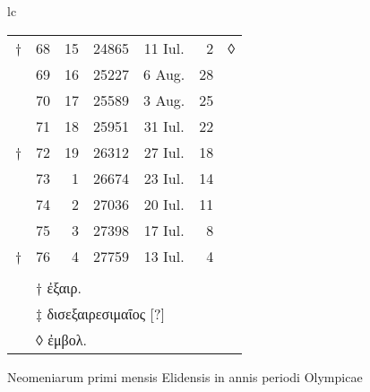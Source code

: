 \begin{tabular}{lc}
\begin{tabular}[t]{r rrccr l}
† & 68 & 15 & 24865 & 11 Iul. &  2 & ◊ \\
\cline{2-6}
~ & 69 & 16 & 25227 &  6 Aug. & 28 \\
~ & 70 & 17 & 25589 &  3 Aug. & 25 \\
~ & 71 & 18 & 25951 & 31 Iul. & 22 \\
† & 72 & 19 & 26312 & 27 Iul. & 18 \\
\cline{2-6}
~ & 73 &  1 & 26674 & 23 Iul. & 14 \\
~ & 74 &  2 & 27036 & 20 Iul. & 11 \\
~ & 75 &  3 & 27398 & 17 Iul. &  8 \\
† & 76 &  4 & 27759 & 13 Iul. &  4 \\
\cline{2-6}
\\
~ & \multicolumn{5}{l}{† \textgreek{ἐξαιρ.}}\\
~ & \multicolumn{5}{l}{‡ \textgreek{δισεξαιρεσιμαῖος [?]}}\\
~ & \multicolumn{5}{l}{◊ \textgreek{ἐμβολ.}}\\
\end{tabular}
\end{tabular}
%
\caption{Neomeniarum primi mensis Elidensis in annis periodi Olympicae}
\label{tab:p038}
%
